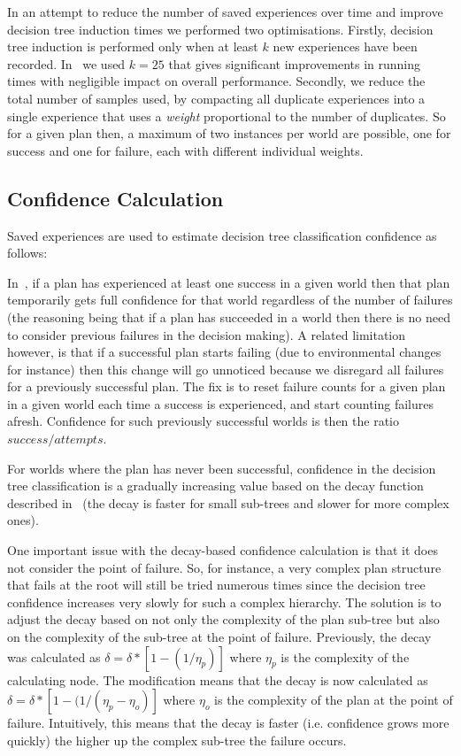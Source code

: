 \documentclass[a4paper]{article}
\begin{document}
In an attempt to reduce the number of saved experiences over time and improve decision tree induction times we performed two optimisations. Firstly, decision tree induction is performed only when at least $k$ new experiences have been recorded. In~\cite{Singh:HYCAS10} we used $k=25$ that gives significant improvements in running times with negligible impact on overall performance. Secondly, we reduce the total number of samples used, by compacting all duplicate experiences into a single experience that uses a \textit{weight} proportional to the number of duplicates. So for a given plan then, a maximum of two instances per world are possible, one for success and one for failure, each with different individual weights.

\subsection{Confidence Calculation}

Saved experiences are used to estimate decision tree classification confidence as follows:

In~\cite{Singh:HYCAS10}, if a plan has experienced at least one success in a given world then that plan temporarily gets full confidence for that world regardless of the number of failures (the reasoning being that if a plan has succeeded in a world then there is no need to consider previous failures in the decision making). A related limitation however, is that if a successful plan starts failing (due to environmental changes for instance) then this change will go unnoticed because we disregard all failures for a previously successful plan. The fix is to reset failure counts for a given plan in a given world each time a success is experienced, and start counting failures afresh. Confidence for such previously successful worlds is then the ratio $success/attempts$.

For worlds where the plan has never been successful, confidence in the decision tree classification is a gradually increasing value based on the decay function described in~\cite{Singh:HYCAS10} (the decay is faster for small sub-trees and slower for more complex ones).

One important issue with the decay-based confidence calculation is that it does not consider the point of failure. So, for instance, a very complex plan structure that fails at the root will still be tried numerous times since the decision tree confidence increases very slowly for such a complex hierarchy. The solution is to adjust the decay based on not only the complexity of the plan sub-tree but also on the complexity of the sub-tree at the point of failure. Previously, the decay was calculated as $\delta = \delta * [1 - (1/\eta_p)]$ where $\eta_p$ is the complexity of the calculating node. The modification means that the decay is now calculated as $\delta = \delta * [1 - (1/(\eta_p-\eta_o)]$ where $\eta_o$ is the complexity of the plan at the point of failure. Intuitively, this means that the decay is faster (i.e. confidence grows more quickly) the higher up the complex sub-tree the failure occurs.
\end{document}

